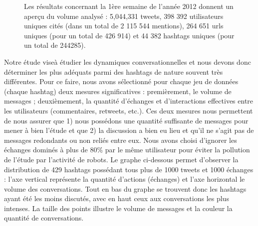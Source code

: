 \begin{figure}

    \caption[Volume de tweets et hashtags pour la semaine 1]{Les r\'esultats concernant la 1\`ere semaine de l{\textquoteright}ann\'ee 2012 donnent un aper\c{c}u du volume analys\'e : 5,044,331 tweets, 398 392 utilisateurs uniques cit\'es (dans un total de 2 115 544 mentions), 264 651 urls uniques (pour un total de 426 914) et 44 382 hashtags uniques (pour un total de 244285).}
\end{figure}



Notre \'etude vise\`a \'etudier les dynamiques conversationnelles et
nous devons donc d\'eterminer les plus ad\'equats parmi des hashtags de
nature souvent tr\`es diff\'erentes. Pour ce faire, nous avons
s\'electionn\'e pour chaque jeu de donn\'ees (chaque hashtag) deux
mesures significatives : premi\`erement, le volume de messages ;
deuxi\`emement, la quantit\'e d{\textquoteright}\'echanges et
d{\textquoteright}interactions effectives entre les utilisateurs
(commentaires, retweets, etc.). Ces deux mesures nous permettent de
nous assurer que 1) nous poss\'edons une quantit\'e suffisante de
messages pour mener \`a bien l{\textquoteright}\'etude et que 2) la
discussion a bien eu lieu et qu{\textquoteright}il ne
s{\textquoteright}agit pas de messages redondants ou non reli\'es entre
eux. Nous avons choisi d{\textquoteright}ignorer les \'echanges
domin\'es \`a plus de 80\% par le m\^eme utilisateur pour \'eviter la
pollution de l{\textquoteright}\'etude par l{\textquoteright}activit\'e
de robots. Le graphe ci-dessous permet d{\textquoteright}observer la
distribution de 429 hashtags poss\'edant tous plus de 1000 tweets et
1000 \'echanges : l{\textquoteright}axe vertical repr\'esente la
quantit\'e d{\textquoteright}actions (\'echanges) et
l{\textquoteright}axe horizontal le volume des conversations. Tout en
bas du graphe se trouvent donc les hashtags ayant \'et\'e les moins
discut\'es, avec en haut ceux aux conversations les plus intenses. La
taille des points illustre le volume de messages et la couleur la
quantit\'e de %
conversations.

